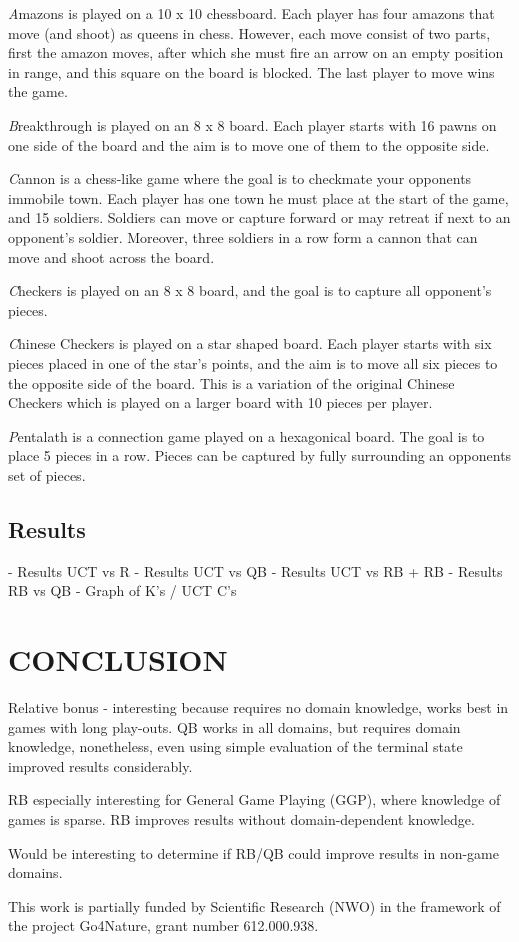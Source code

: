 \documentclass{ecai2014}
\begin{document}
{\emph Amazons} is played on a 10 x 10 chessboard. Each player has four amazons that move (and shoot) as queens in chess. However, each move consist of two parts, first the amazon moves, after which she must fire an arrow on an empty position in range, and this square on the board is blocked. The last player to move wins the game.

{\emph Breakthrough} is played on an 8 x 8 board. Each player starts with 16 pawns on one side of the board and the aim is to move one of them to the opposite side.

{\emph Cannon} is a chess-like game where the goal is to checkmate your opponents immobile town. Each player has one town he must place at the start of the game, and 15 soldiers. Soldiers can move or capture forward or may retreat if next to an opponent's soldier. Moreover, three soldiers in a row form a cannon that can move and shoot across the board.

{\emph Checkers} is played on an 8 x 8 board, and the goal is to capture all opponent's pieces.

{\emph Chinese Checkers} is played on a star shaped board. Each player starts with six pieces placed in one of the star's points, and the aim is to move all six pieces to the opposite side of the board. This is a variation of the original Chinese Checkers which is played on a larger board with 10 pieces per player.

{\emph Pentalath} is a connection game played on a hexagonical board. The goal is to place 5 pieces in a row. Pieces can be captured by fully surrounding an opponents set of pieces.

\subsection{Results}
\label{subsec:results}
- Results UCT vs R
- Results UCT vs QB
- Results UCT vs RB + RB
- Results RB vs QB
- Graph of K's / UCT C's

\section{CONCLUSION}
Relative bonus - interesting because requires no domain knowledge, works best in games with long play-outs.
QB works in all domains, but requires domain knowledge, nonetheless, even using simple evaluation of the terminal state improved results considerably.

RB especially interesting for General Game Playing (GGP), where knowledge of games is sparse. RB improves results without domain-dependent knowledge.

Would be interesting to determine if RB/QB could improve results in non-game domains.

\ack This work is partially funded by Scientific Research (NWO) in the framework of the project Go4Nature, grant number 612.000.938.


\end{document}
